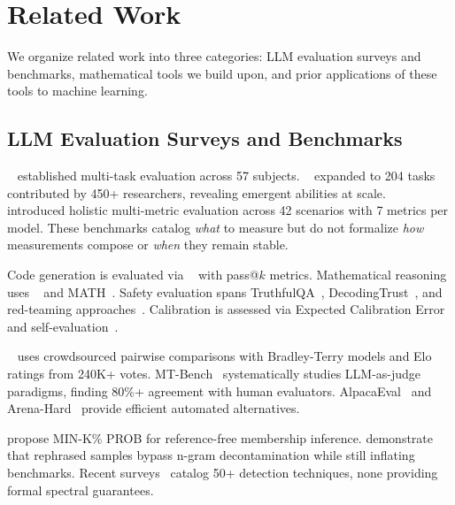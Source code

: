\section{Related Work}
\label{sec:related}

We organize related work into three categories: LLM evaluation surveys and benchmarks, mathematical tools we build upon, and prior applications of these tools to machine learning.

\subsection{LLM Evaluation Surveys and Benchmarks}

\mmlu~\citep{hendrycks2021mmlu} established multi-task evaluation across 57 subjects.
\bigbench~\citep{srivastava2022bigbench} expanded to 204 tasks contributed by 450+ researchers, revealing emergent abilities at scale.
\helm~\citep{liang2022helm} introduced holistic multi-metric evaluation across 42 scenarios with 7 metrics per model.
These benchmarks catalog \emph{what} to measure but do not formalize \emph{how} measurements compose or \emph{when} they remain stable.

Code generation is evaluated via \humaneval~\citep{chen2021evaluating} with pass@$k$ metrics.
Mathematical reasoning uses \gsmk~\citep{cobbe2021gsm8k} and MATH~\citep{hendrycks2021math}.
Safety evaluation spans TruthfulQA~\citep{lin2022truthfulqa}, DecodingTrust~\citep{wang2023decodingtrust}, and red-teaming approaches~\citep{perez2022redteaming, zou2023universal}.
Calibration is assessed via Expected Calibration Error~\citep{guo2017calibration, naeini2015ece} and self-evaluation~\citep{kadavath2022language}.

\chatbotarena~\citep{chiang2024chatbot} uses crowdsourced pairwise comparisons with Bradley-Terry models and Elo ratings from 240K+ votes.
MT-Bench~\citep{zheng2023judging} systematically studies LLM-as-judge paradigms, finding 80\%+ agreement with human evaluators.
AlpacaEval~\citep{li2023alpacaeval} and Arena-Hard~\citep{li2024arenahard} provide efficient automated alternatives.

\citet{shi2023detecting} propose MIN-K\% PROB for reference-free membership inference.
\citet{yang2023rethinking} demonstrate that rephrased samples bypass n-gram decontamination while still inflating benchmarks.
Recent surveys~\citep{xu2024contamination, deng2024contamination} catalog 50+ detection techniques, none providing formal spectral guarantees.

